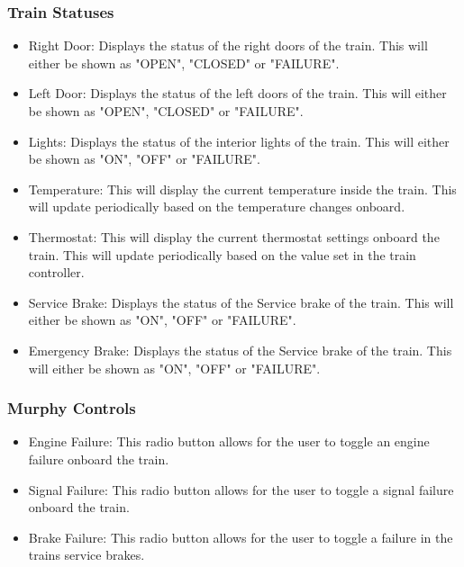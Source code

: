 \documentclass[letterpaper]{article}
\begin{document}
\subsubsection{Train Statuses}
\begin{itemize}
	\item Right Door:  Displays the status of the right doors of the train. This will either be shown as "OPEN", "CLOSED" or "FAILURE".
	\item Left Door:  Displays the status of the left doors of the train. This will either be shown as "OPEN", "CLOSED" or "FAILURE".
	\item Lights:  Displays the status of the interior lights of the train. This will either be shown as "ON", "OFF" or "FAILURE".
	\item Temperature: This will display the current temperature inside the train. This will update periodically based on the temperature changes onboard.
	\item Thermostat: This will display the current thermostat settings onboard the train. This will update periodically based on the value set in the train controller.
	\item Service Brake:  Displays the status of the Service brake of the train. This will either be shown as "ON", "OFF" or "FAILURE".
	\item Emergency Brake:  Displays the status of the Service brake of the train. This will either be shown as "ON", "OFF" or "FAILURE".
\end{itemize}
	\subsubsection{Murphy Controls}
	\begin{itemize}
		\item Engine Failure: This radio button allows for the user to toggle an engine failure onboard the train.
		\item Signal Failure: This radio button allows for the user to toggle a signal failure onboard the train.
		\item Brake Failure: This radio button allows for the user to toggle a failure in the trains service brakes.
	\end{itemize}
\end{document}
